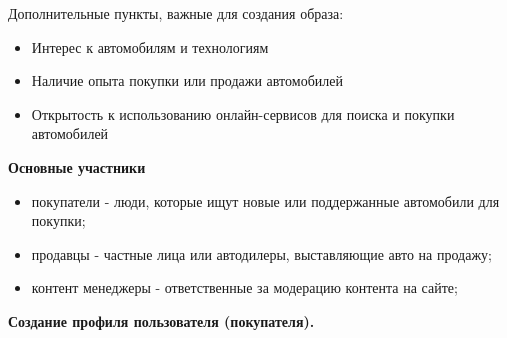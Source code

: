 Дополнительные пункты, важные для создания образа:
\begin{itemize}
    \item Интерес к автомобилям и технологиям
    \item Наличие опыта покупки или продажи автомобилей
    \item Открытость к использованию онлайн-сервисов для поиска и покупки автомобилей
\end{itemize}
\bigskip

\textbf{Основные участники}
\bigskip

\begin{itemize}
    \item покупатели - люди, которые ищут новые или поддержанные автомобили для покупки;
    \item продавцы - частные лица или автодилеры, выставляющие авто на продажу;
    \item контент менеджеры - ответственные за модерацию контента на сайте;
\end{itemize}

\textbf{Создание профиля пользователя (покупателя).}



\noindent
\begin{minipage}{\linewidth}
\end{minipage}
\bigskip

